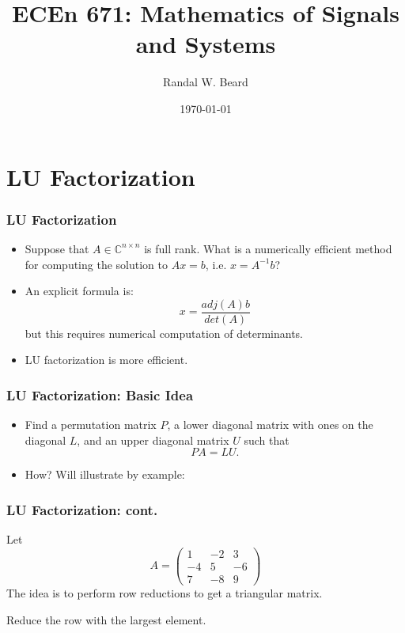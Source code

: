 \documentclass{beamer}
\title{ECEn 671: Mathematics of Signals and Systems}
\author{Randal W. Beard}
\institute{Brigham Young University}
\date{\today}
\begin{document}
\begin{frame}
	\titlepage
\end{frame}

\section{LU Factorization}
\frame{\sectionpage}


\begin{frame}\frametitle{LU Factorization}
	\begin{itemize}
		\item 	Suppose that $A \in \mathbb{C}^{n\times n}$ is full rank.  What is a numerically efficient method for computing the solution to $Ax = b$, i.e. $x = A^{-1}b$?
		\item An explicit formula is:
			\[ x = \frac{adj(A)b}{det(A)} \]
			but this requires numerical computation of determinants.
		\item LU factorization is more efficient.
	\end{itemize}
\end{frame}

\begin{frame}\frametitle{LU Factorization: Basic Idea}
	\begin{itemize}
		\item Find a permutation matrix $P$, a lower diagonal matrix with ones on the diagonal $L$, and an upper diagonal matrix $U$ such that
			\[ PA = LU.\]
		\item How?  Will illustrate by example:
	\end{itemize}
\end{frame}

\begin{frame}\frametitle{LU Factorization: cont.}
	Let 
	\[ 
	A = \begin{pmatrix} 
    		1 & -2 & 3\\
    		-4 & 5 & -6\\
    		7 & -8 & 9
    	\end{pmatrix}
    \]
	The idea is to perform row reductions to get a triangular matrix.  
	\par{}  Reduce the row with the largest element.
\end{frame}
\end{document}
